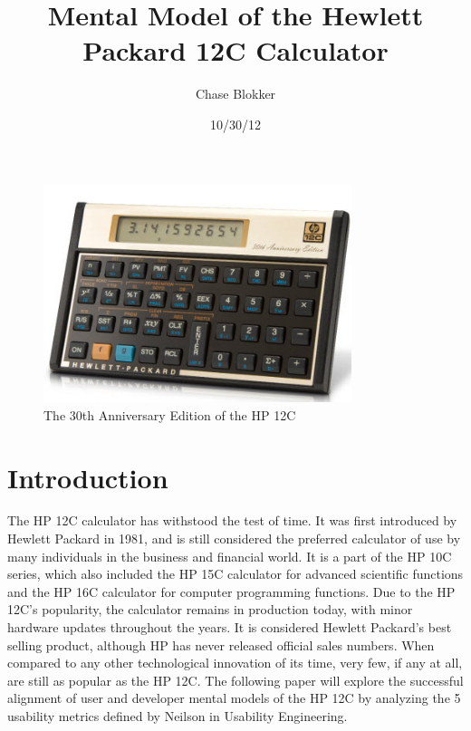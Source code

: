 \documentclass{article}
\title{Mental Model of the Hewlett Packard 12C Calculator}
\author{Chase Blokker}
\date{10/30/12}
\begin{document}
\maketitle


\begin{figure}[ht!]
\centering
\includegraphics[width=90mm]{hp-calc-4.jpg}
\caption{The 30th Anniversary Edition of the HP 12C}
\label{overflow}
\end{figure}

\pagebreak

\section{Introduction}
\label{Introduction}

The HP 12C calculator has withstood the test of time.  It was first introduced by Hewlett Packard in 1981, and is still considered the preferred calculator of use by many individuals in the business and financial world.   It is a part of the HP 10C series, which also included the HP 15C calculator for advanced scientific functions and the HP 16C calculator for computer programming functions.  Due to the HP 12C’s popularity, the calculator remains in production today, with minor hardware updates throughout the years.  It is considered Hewlett Packard’s best selling product, although HP has never released official sales numbers.  When compared to any other technological innovation of its time, very few, if any at all, are still as popular as the HP 12C.  The following paper will explore the successful alignment of user and developer mental models of the HP 12C by analyzing the 5 usability metrics defined by Neilson in Usability Engineering.
\end{document}

